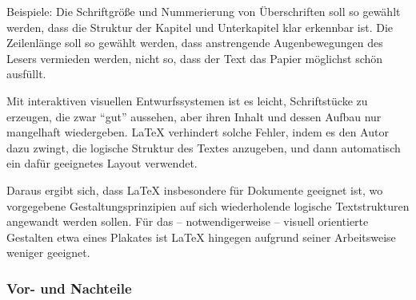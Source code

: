 Beispiele:
Die Schriftgröße und Nummerierung von Überschriften soll so
gewählt werden, dass die Struktur der Kapitel und Unterkapitel
klar erkennbar ist.
Die Zeilenlänge soll so gewählt werden, dass anstrengende
Augenbewegungen des Lesers vermieden werden, nicht so, dass der
Text das Papier möglichst schön ausfüllt.
 
Mit interaktiven visuellen Entwurfssystemen ist es leicht,  
Schriftstücke zu erzeugen, die zwar "`gut"' aussehen,
aber ihren Inhalt und dessen Aufbau nur mangelhaft wiedergeben.
\LaTeX{} verhindert solche
Fehler, indem es den Autor dazu zwingt, die logische
Struktur des Textes anzugeben, und dann automatisch ein dafür
geeignetes Layout verwendet.

Daraus ergibt sich, dass \LaTeX{} insbesondere für  Dokumente geeignet 
ist, wo vorgegebene Gestaltungsprinzipien auf sich wiederholende
logische Textstrukturen angewandt werden sollen. 
Für das -- notwendigerweise -- visuell orientierte Gestalten
etwa eines Plakates ist \LaTeX{} hingegen 
aufgrund seiner Arbeitsweise weniger geeignet.

\subsubsection{Vor- und Nachteile}

